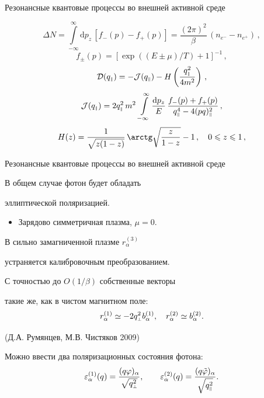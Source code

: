 \documentclass{beamer}
\def\mprp{\mbox{\tiny $\bot$}}
\def\mprl{\mbox{\tiny $\|$}}
\newcommand{\dd}{\mathrm{d}}
\begin{document}
\begin{frame}{Резонансные квантовые процессы во внешней активной среде}
\begin{center}
$$\Delta N = \int\limits_{-\infty}^{\infty}  \dd p_z 
\, \left [f_{-}(p) - f_{+}(p) \right]  = \frac{(2 \pi)^2}{\beta} \, (n_{e^-} - n_{e^+}) \, , $$
$$f_{\pm} (p) = [\exp((E\pm\mu)/T)+1]^{-1}\, ,$$
$${\cal D}(q_{\mprl}) = - {\cal J} (q_{\mprl})  - 
H \left (\frac{q^2_{\mprl}}{4m^2} \right) \, , $$
$${\cal J} (q_{\mprl}) = 2q^2_{\mprl} \, m^2 \, \int\limits_{-\infty}^{\infty}  \frac{\dd p_z}{E} \, 
\frac{f_{-}(p) + f_{+}(p)}{q_{\mprl}^4 - 4(pq)^2_{\mprl}} \, , $$
$$H(z)=\frac{1}{\sqrt{z(1 - z)}} \, \arctg \sqrt{\frac{z}{1 - z}} - 1 \, , \quad
0 \leqslant z \leqslant 1 \,  ,$$
\end{center}
\end{frame}
\begin{frame}{Резонансные квантовые процессы во внешней активной среде}
\begin{center}

В общем случае фотон будет обладать 

\alert{эллиптической поляризацией.}

\begin{itemize}
\item Зарядово симметричная плазма, $\mu = 0$.
\end{itemize}

В сильно замагниченной плазме $r_\alpha^{(3)}$ 

устраняется калибровочным преобразованием.

\vspace*{2mm}
С точностью до $O(1/\beta)$ собственные векторы 

такие же, как в чистом магнитном поле:
$$r_\alpha^{(1)} \simeq -2q_{\mprp}^2 b_\alpha^{(1)}, \quad r_\alpha^{(2)} \simeq b_\alpha^{(2)}.$$

(Д.А. Румянцев, М.В. Чистяков 2009)

Можно ввести два поляризационных состояния фотона:
$$\varepsilon_\alpha^{(1)}(q) = \frac{(q \varphi)_\alpha}{\sqrt{q_{\mprp}^2}},
\qquad
\varepsilon_\alpha^{(2)}(q) = \frac{(q \tilde \varphi)_\alpha}
{\sqrt{q_{\mprl}^2}}.$$
\end{center}
\end{frame}
\end{document}
